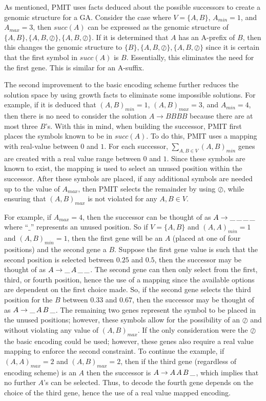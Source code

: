 \documentclass{llncs}
\begin{document}
	As mentioned, PMIT uses facts deduced about the possible successors to create a genomic structure for a GA. Consider the case where $V = \{A,B\}$, $A_{min} = 1$, and $A_{max} = 3$, then $succ(A)$ can be expressed as the genomic structure of $\{A,B\},\{A,B,\oslash\},\{A,B,\oslash\}$. If it is determined that $A$ has an A-prefix of $B$, then this changes the genomic structure to $\{B\},\{A,B,\oslash\},\{A,B,\oslash\}$ since it is certain that the first symbol in $succ(A)$ is $B$. Essentially, this eliminates the need for the first gene. This is similar for an A-suffix. 
	
	The second improvement to the basic encoding scheme further reduces the solution space by using growth facts to eliminate some impossible solutions. For example, if it is deduced that $(A,B)_{min} = 1$, $(A,B)_{max} = 3$, and $A_{min} = 4$, then there is no need to consider the solution $A \to BBBB$ because there are at most three $B$'s. With this in mind, when building the successor, PMIT first places the symbols known to be in $succ(A)$. To do this, PMIT uses a mapping with real-value between $0$ and $1$. For each successor, $\sum_{A,B \in V} (A,B)_{min}$ genes are created with a real value range between $0$ and $1$. Since these symbols are known to exist, the mapping is used to select an unused position within the successor. After these symbols are placed, if any additional symbols are needed up to the value of $A_{max}$, then PMIT selects the remainder by using $\oslash$, while ensuring that $(A,B)_{max}$ is not violated for any $A,B \in V$.
	
	For example, if $A_{max} = 4$, then the successor can be thought of as $A \rightarrow \_ \thinspace \_ \thinspace \_ \thinspace \_$ where ``$\_$'' represents an unused position. So if $V = \{A,B\}$ and $(A,A)_{min} = 1$ and $(A,B)_{min} = 1$, then the first gene will be an $A$ (placed at one of four positions) and the second gene a $B$. Suppose the first gene value is such that the second position is selected between $0.25$ and $0.5$, then the successor may be thought of as $A \rightarrow \_ \thinspace A \thinspace \_ \thinspace \_$. The second gene can then only select from the first, third, or fourth position, hence the use of a mapping since the available options are dependent on the first choice made. So, if the second gene selects the third position for the $B$ between $0.33$ and $0.67$, then the successor may be thought of as $A \rightarrow \_ \thinspace A \thinspace B \thinspace \_$. The remaining two genes represent the symbol to be placed in the unused positions; however, these symbols allow for the possibility of an $\oslash$ and without violating any value of $(A,B)_{max}$. If the only consideration were the $\oslash$ the basic encoding could be used; however, these genes also require a real value mapping to enforce the second constraint. To continue the example, if $(A,A)_{max} = 2$ and $(A,B)_{max} = 2$, then if the third gene (regardless of encoding scheme) is an $A$ then the successor is $A \rightarrow A \thinspace A \thinspace B \thinspace \_$, which implies that no further $A$'s can be selected. Thus, to decode the fourth gene depends on the choice of the third gene, hence the use of a real value mapped encoding.
	
\end{document}
